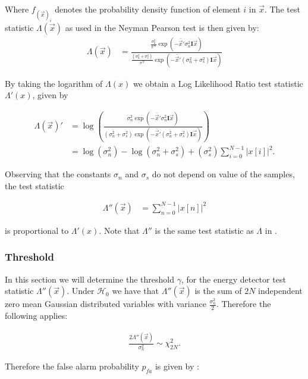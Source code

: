 \documentclass[a4paper, openany, oneside]{memoir}
\begin{document}
Where $f_{(\vec{x})_i}$ denotes the probability density function of element $i$ in $\vec{x}$.  The test statistic $\Lambda(\vec{x})$ as used in the Neyman Pearson test is then given by:
\begin{align*}
\Lambda(\vec{x}) &=\frac{\frac{\sigma_n^2}{\pi^N } \exp(-\bar{\vec{x}}'\sigma_n^2\mathbf{I}\vec{x})}{\frac{(\sigma_n^2 + \sigma_s^2)}{\pi^N } \exp(-\bar{\vec{x}}'(\sigma_n^2+\sigma_s^2)\mathbf{I}\vec{x})}
\end{align*}


By taking the logarithm of $\Lambda(x)$ we obtain a Log Likelihood Ratio test statistic $\Lambda'(x)$, given by

\begin{align*}
\Lambda(\vec{x})' &= \log \left(
\frac{\sigma_n^2\exp(-\overline{\vec{x}}'\sigma_n^2\mathbf{I}\vec{x})}{(\sigma_n^2 + \sigma_s^2)\exp(-\bar{\vec{x}}'(\sigma_n^2+\sigma_s^2)\mathbf{I}\vec{x})}\right) \\
&= \log\left(\sigma_n^2\right) - \log\left(\sigma_n^2 + \sigma_s^2\right) +  (\sigma_s^2) \sum_{i=0}^{N-1} |x[i]|^2. 
\end{align*}

Observing that the constants $\sigma_n$ and $\sigma_s$ do not depend on value of the samples, the test statistic 

\begin{align*}
\Lambda''(\vec{x}) &= \sum_{n=0}^{N-1} |x[n]|^2
\end{align*} 

is proportional to $\Lambda'(x)$. Note that $\Lambda''$ is the same test statistic as $\Lambda$ in .

\subsubsection{Threshold}
In this section we will determine the threshold $\gamma$, for the energy detector test statistic $\Lambda''(\vec{x})$.
Under $\mathcal{H}_0$ we have that $\Lambda''(\vec{x})$ is the sum of $2N$ independent zero mean Gaussian distributed variables
with variance $\frac{\sigma_n^2}{2}$. Therefore the following applies:

\begin{align}
    \frac{2\Lambda''(\vec{x})}{\sigma_n^2} \sim \chi^2_{2N}.
\end{align}

Therefore the false alarm probability $p_{fa}$ is given by \cite{rugini2013small}:
\end{document}
